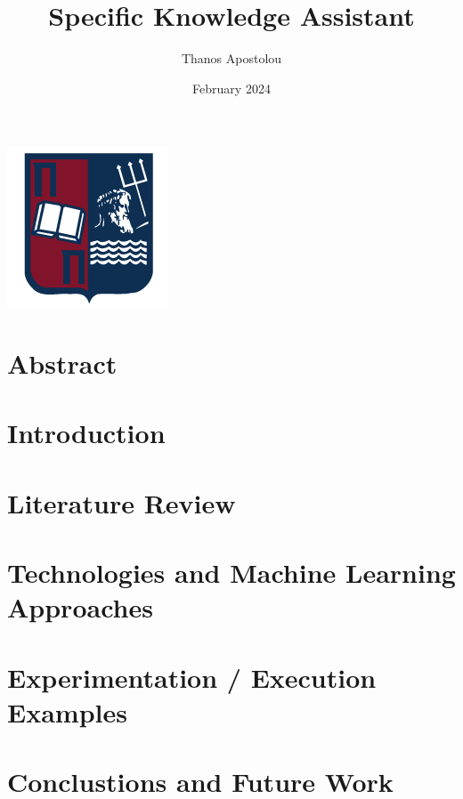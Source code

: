 \documentclass[12pt,a4paper]{report}
\title{Specific Knowledge Assistant}
\author{Thanos Apostolou}
\date{February 2024}
\begin{document}
\includegraphics{unipi.png}

\maketitle
\newpage

\tableofcontents

\newpage
\chapter{Abstract}

\newpage
\chapter{Introduction}

\newpage
\chapter{Literature Review}

\newpage
\chapter{Technologies and Machine Learning Approaches}

\newpage
\chapter{Experimentation / Execution Examples}

\newpage
\chapter{Conclustions and Future Work}

\end{document}

